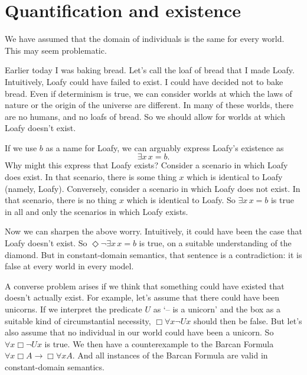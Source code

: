 \section{Quantification and existence}

We have assumed that the domain of individuals is the same for every world. This
may seem problematic.

Earlier today I was baking bread. Let's call the loaf of bread that I made
Loafy. Intuitively, Loafy could have failed to exist. I could have decided not
to bake bread. Even if determinism is true, we can consider worlds at which the
laws of nature or the origin of the universe are different. In many of these
worlds, there are no humans, and no loafs of bread. So we should allow for
worlds at which Loafy doesn't exist.

If we use $b$ as a name for Loafy, we can arguably express Loafy's existence as
\[
  \exists x \,x\!=\!b.
\]
Why might this express that Loafy exists? Consider a scenario in which Loafy does
exist. In that scenario, there is some thing $x$ which is identical to Loafy
(namely, Loafy). Conversely, consider a scenario in which Loafy does not exist.
In that scenario, there is no thing $x$ which is identical to Loafy. So
$\exists x\, x\!=\!b$ is true in all and only the scenarios in which Loafy exists.

Now we can sharpen the above worry. Intuitively, it could have been the case
that Loafy doesn't exist. So $\Diamond \neg \exists x\, x\!=\!b$ is true, on a
suitable understanding of the diamond. But in constant-domain semantics, that
sentence is a contradiction: it is false at every world in every model.

A converse problem arises if we think that something could have existed that
doesn't actually exist. For example, let's assume that there could have been
unicorns. If we interpret the predicate $U$ as `-- is a unicorn' and the box as
a suitable kind of circumstantial necessity, $\Box \forall x \neg Ux$ should
then be false. But let's also assume that no individual in our world could have
been a unicorn. So $\forall x \Box \neg Ux$ is true. We then have a
counterexample to the Barcan Formula $\forall x \Box A \to \Box \forall x A$.
And all instances of the Barcan Formula are valid in constant-domain semantics.


